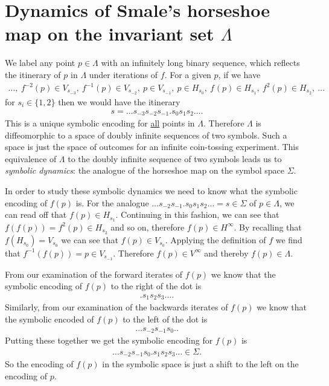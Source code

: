 \section{Dynamics of Smale's horseshoe map on the invariant set $\Lambda$}
We label any point $p\in \Lambda$ with an infinitely long binary sequence, which reflects the itinerary of $p$ in $\Lambda$ under iterations of $f$. For a given $p$, if we have 
\begin{align}
	\ldots,\
	f^{-2}(p) \in V_{s_{-3}},\
	f^{-1}(p) \in V_{s_{-2}},\
	p \in V_{s_{-1}},\
	p \in H_{s_{0}},\
	f^{}(p) \in H_{s_{1}},\
	f^{2}(p) \in H_{s_{2}},\
\ldots	
\end{align}
for $s_i\in \{1,2\}$ then we would have the itinerary 
\begin{align}
	\boxed{
s  = \ldots s_{-3}s_{-2}s_{-1} \bm{.}  s_0 s_{1}s_{2}\ldots.
	}
\end{align}
This is a unique symbolic encoding for \underline{all} points in $\Lambda$. Therefore $\Lambda$ is diffeomorphic to a space of doubly infinite sequences of two symbols. Such a space is just the space of outcomes for an infinite coin-tossing experiment. This equivalence of $\Lambda$ to the doubly infinite sequence of two symbols leads us to \emph{symbolic dynamics}: the analogue of the horseshoe map on the symbol space $\Sigma$.

In order to study these symbolic dynamics we need to know what the symbolic encoding of $f(p)$ is. For the analogue $\ldots s_{-2}s_{-1}\bm{.} s_0 s_1 s_2 \ldots = s\in \Sigma$ of $p\in \Lambda $, we can read off that $f(p)\in H_{s_1}$. Continuing in this fashion, we can see that $f(f(p))=f^{2}(p) \in H_{s_2}$ and so on, therefore $f(p)\in H^{\infty }$. By recalling that $f(H_{s_0}) = V_{s_0}$ we can see that $f(p) \in V_{s_0}$. Applying the definition of $f$ we find that $f^{-1}(f(p)) = p \in V_{s_{-1}}$. Therefore $f(p)\in V^{\infty }$ and thereby $f(p) \in \Lambda$. 

From our examination of the forward iterates of $f(p)$ we know that the symbolic encoding of $f(p)$ to the right of the dot is
\begin{align}
	\bm{.}s_1 s_2 s_3\ldots. 
\end{align}
Similarly, from our examination of the backwards iterates of $f(p)$ we know that the symbolic encoded of $f(p)$ to the left of the dot is
\begin{align}
\ldots s_{-2} s_{-1} s_{0} \bm{.}. 
\end{align}
Putting these together we get the symbolic encoding for $f(p)$ is 
\begin{align}
	\ldots s_{-2} s_{-1} s_{0} \bm{.} s_1 s_2 s_3 \ldots \in \Sigma.
\end{align}
So the encoding of $f(p)$ in the symbolic space is just a shift to the left on the encoding of $p$.

